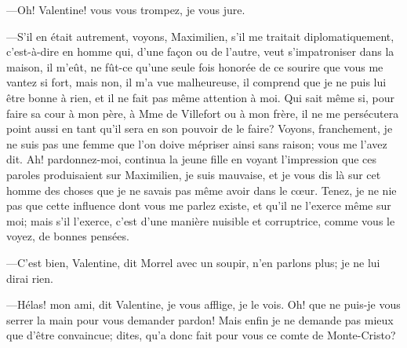 —Oh! Valentine! vous vous trompez, je vous jure. 

—S'il en était autrement, voyons, Maximilien, s'il me traitait diplomatiquement, c'est-à-dire en homme qui, d'une façon ou de l'autre, veut s'impatroniser dans la maison, il m'eût, ne fût-ce qu'une seule fois honorée de ce sourire que vous me vantez si fort, mais non, il m'a vue malheureuse, il comprend que je ne puis lui être bonne à rien, et il ne fait pas même attention à moi. Qui sait même si, pour faire sa cour à mon père, à Mme de Villefort ou à mon frère, il ne me persécutera point aussi en tant qu'il sera en son pouvoir de le faire? Voyons, franchement, je ne suis pas une femme que l'on doive mépriser ainsi sans raison; vous me l'avez dit. Ah! pardonnez-moi, continua la jeune fille en voyant l'impression que ces paroles produisaient sur Maximilien, je suis mauvaise, et je vous dis là sur cet homme des choses que je ne savais pas même avoir dans le cœur. Tenez, je ne nie pas que cette influence dont vous me parlez existe, et qu'il ne l'exerce même sur moi; mais s'il l'exerce, c'est d'une manière nuisible et corruptrice, comme vous le voyez, de bonnes pensées. 

—C'est bien, Valentine, dit Morrel avec un soupir, n'en parlons plus; je ne lui dirai rien. 

—Hélas! mon ami, dit Valentine, je vous afflige, je le vois. Oh! que ne puis-je vous serrer la main pour vous demander pardon! Mais enfin je ne demande pas mieux que d'être convaincue; dites, qu'a donc fait pour vous ce comte de Monte-Cristo? 

